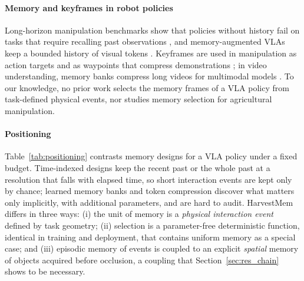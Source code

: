 \paragraph{Memory and keyframes in robot policies} Long-horizon manipulation benchmarks show that policies without history fail on tasks that require recalling past observations , and memory-augmented VLAs keep a bounded history of visual tokens . Keyframes are used in manipulation as action targets \citep{shridhar2022peract} and as waypoints that compress demonstrations \citep{shi2023awe}; in video understanding, memory banks compress long videos for multimodal models \citep{he2024malmm}. To our knowledge, no prior work selects the memory frames of a VLA policy from task-defined physical events, nor studies memory selection for agricultural manipulation.

\paragraph{Positioning} Table~\ref{tab:positioning} contrasts memory designs for a VLA policy under a fixed budget. Time-indexed designs keep the recent past or the whole past at a resolution that falls with elapsed time, so short interaction events are kept only by chance; learned memory banks and token compression discover what matters only implicitly, with additional parameters, and are hard to audit. HarvestMem differs in three ways: (i) the unit of memory is a \emph{physical interaction event} defined by task geometry; (ii) selection is a parameter-free deterministic function, identical in training and deployment, that contains uniform memory as a special case; and (iii) episodic memory of events is coupled to an explicit \emph{spatial} memory of objects acquired before occlusion, a coupling that Section~\ref{sec:res_chain} shows to be necessary.

